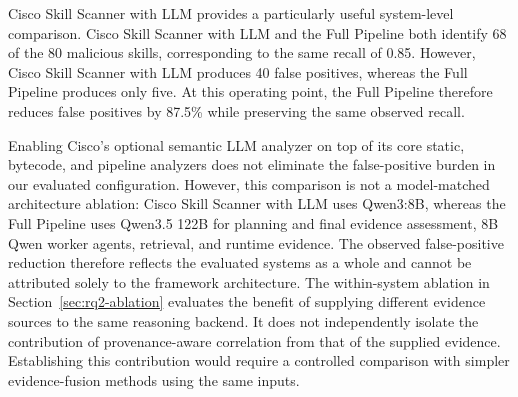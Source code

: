 Cisco Skill Scanner with LLM provides a particularly useful
system-level comparison. Cisco Skill Scanner with LLM and the Full Pipeline both identify
68 of the 80 malicious skills, corresponding to the same recall
of 0.85. However, Cisco Skill Scanner with LLM produces 40 false
positives, whereas the Full Pipeline produces only five. At this
operating point, the Full Pipeline therefore reduces false positives
by 87.5\% while preserving the same observed recall.

Enabling Cisco's optional semantic LLM analyzer on top of its core
static, bytecode, and pipeline analyzers does not eliminate the
false-positive burden in our evaluated configuration. However, this comparison is not a model-matched
architecture ablation: Cisco Skill Scanner with LLM
uses Qwen3:8B, whereas the Full Pipeline uses
Qwen3.5 122B for planning and final evidence assessment,
8B Qwen worker agents, retrieval, and runtime evidence.
The observed false-positive reduction therefore
reflects the evaluated systems as a whole and cannot
be attributed solely to the framework architecture. 
The within-system ablation in
Section~\ref{sec:rq2-ablation} evaluates the benefit of
supplying different evidence sources to the same reasoning
backend. It does not independently isolate the contribution
of provenance-aware correlation from that of the supplied
evidence. Establishing this contribution would require
a controlled comparison with simpler evidence-fusion
methods using the same inputs.

